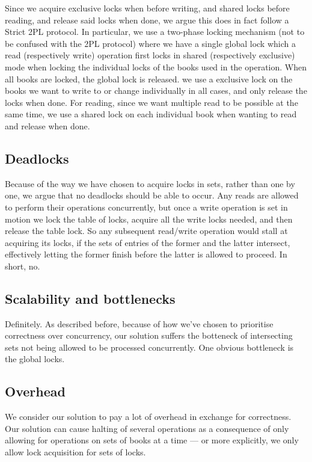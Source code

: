 Since we acquire exclusive locks when before writing, and shared locks before reading, and release said locks when done, we argue this does in fact follow a Strict 2PL protocol. In particular, we use a two-phase locking mechanism (not to be confused with the 2PL protocol) where we have a single global lock which a read (respectively write) operation first locks in shared (respectively exclusive) mode when locking the individual locks of the books used in the operation. When all books are locked, the global lock is released. we use a exclusive lock on the books we want to write to or change individually in all cases, and only release the locks when done. For reading, since we want multiple read to be possible at the same time, we use a shared lock on each individual book when wanting to read and release when done.

\subsection{Deadlocks}
Because of the way we have chosen to acquire locks in sets, rather than one by
one, we argue that no deadlocks should be able to occur. Any reads are allowed
to perform their operations concurrently, but once a write operation is set in
motion we lock the table of locks, acquire all the write locks needed, and then
release the table lock. So any subsequent read/write operation would stall at
acquiring its locks, if the sets of entries of the former and the latter
intersect, effectively letting the former finish before the latter is allowed
to proceed. In short, no.

\subsection{Scalability and bottlenecks}
Definitely. As described before, because of how we've chosen to prioritise
correctness over concurrency, our solution suffers the botteneck of intersecting
sets not being allowed to be processed concurrently.
One obvious bottleneck is the global locks.

\subsection{Overhead}
We consider our solution to pay a lot of overhead in exchange for correctness.
Our solution can cause halting of several operations as a consequence of only
allowing for operations on sets of books at a time --- or more explicitly, we
only allow lock acquisition for sets of locks.


